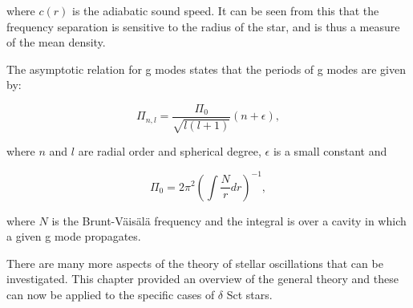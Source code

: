 \noindent where $c(r)$ is the adiabatic sound speed. It can be seen from this that the frequency separation is sensitive to the radius of the star, and is thus a measure of the mean density. 

The asymptotic relation for g modes states that the periods of g modes are given by: 

\begin{equation}
    \Pi_{n,l} = \frac{\Pi_0}{\sqrt{l(l+1)}}(n+\epsilon),
\end{equation}

\noindent where $n$ and $l$ are radial order and spherical degree, $\epsilon$ is a small constant and 

\begin{equation}
    \Pi_{0} = 2\pi^2\left(\int \frac{N}{r} dr\right)^{-1},
\end{equation}

\noindent where $N$ is the Brunt-Väisälä frequency and the integral is over a cavity in which a given g mode propagates.

There are many more aspects of the theory of stellar oscillations that can be investigated. This chapter provided an overview of the general theory and these can now be applied to the specific cases of $\delta$ Sct stars. 


